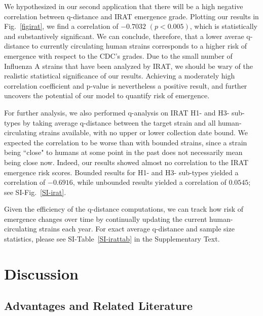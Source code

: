 \documentclass[onecolumn, compsoc,10pt]{IEEEtran}
\begin{document}
We hypothesized in our second application that there will be a high negative correlation between q-distance and IRAT emergence grade. Plotting our results in Fig.~\ref{figirat}, we find a correlation of $-0.7032$ $(p < 0.005)$, which is statistically and substantively significant. We can conclude, therefore, that a lower averae q-distance to currently circulating human strains corresponds to a higher risk of emergence with respect to the CDC's grades. Due to the small number of Influenza A strains that have been analyzed by IRAT, we should be wary of the realistic statistical significance of our results. Achieving a moderately high correlation coefficient and p-value is nevertheless a positive result, and further uncovers the potential of our model to quantify risk of emergence. 

For further analysis, we also performed q-analysis on IRAT H1- and H3- sub-types by taking average q-distance between the target strain and all human-circulating strains available, with no upper or lower collection date bound. We expected the correlation to be worse than with bounded strains, since a strain being ``close" to humans at some point in the past does not necessarily mean being close now. Indeed, our results showed almost no correlation to the IRAT emergence risk scores. Bounded results for H1- and H3- sub-types yielded a correlation of $-0.6916$, while unbounded results yielded a correlation of $0.0545$; see SI-Fig.~\ref{SI-irat}.

Given the efficiency of the q-distance computations, we can track how risk of emergence changes over time by continually updating the current human-circulating strains each year. For exact average q-distance and \qnet sample size statistics, please see SI-Table~\ref{SI-irattab} in the Supplementary Text.

\section*{Discussion}

\subsection*{\enet Advantages and Related Literature}
\end{document}
